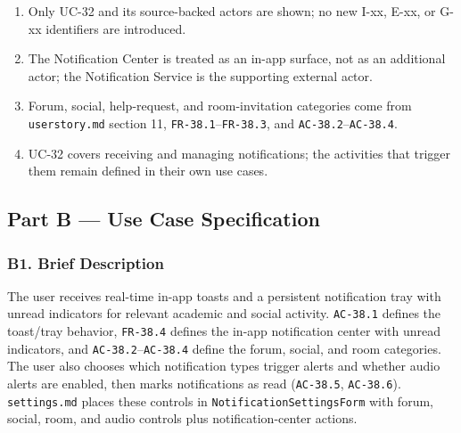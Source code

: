 \documentclass[12pt]{article}
\begin{document}
\begin{enumerate}
\item Only UC-32 and its source-backed actors are shown; no new I-xx, E-xx, or G-xx identifiers are introduced.
\item The Notification Center is treated as an in-app surface, not as an additional actor; the Notification Service is the supporting external actor.
\item Forum, social, help-request, and room-invitation categories come from \texttt{userstory.md} section 11, \texttt{FR-38.1}--\texttt{FR-38.3}, and \texttt{AC-38.2}--\texttt{AC-38.4}.
\item UC-32 covers receiving and managing notifications; the activities that trigger them remain defined in their own use cases.
\end{enumerate}
\par\medskip

\hypertarget{sec:part-b-use-case-specification}{}
\subsection*{Part B --- Use Case Specification}
\par\medskip

\hypertarget{sec:b1-brief-description}{}
\subsubsection*{B1. Brief Description}
\par\medskip

The user receives real-time in-app toasts and a persistent notification tray with unread indicators for relevant academic and social activity. \texttt{AC-38.1} defines the toast/tray behavior, \texttt{FR-38.4} defines the in-app notification center with unread indicators, and \texttt{AC-38.2}--\texttt{AC-38.4} define the forum, social, and room categories. The user also chooses which notification types trigger alerts and whether audio alerts are enabled, then marks notifications as read (\texttt{AC-38.5}, \texttt{AC-38.6}). \texttt{settings.md} places these controls in \texttt{NotificationSettingsForm} with forum, social, room, and audio controls plus notification-center actions.
\par\medskip

\hypertarget{sec:b2-preconditions}{}
\end{document}
